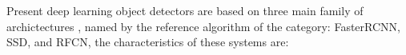 \documentclass[12pt, a4paper, titlepage,twoside,openright]{article}
\begin{document}


Present deep learning object detectors are based on three main family of archictectures \cite{cnnComparision}, named by the reference algorithm of the category: FasterRCNN, SSD, and RFCN, the characteristics of these systems are:

%		
%
%
\end{document}
